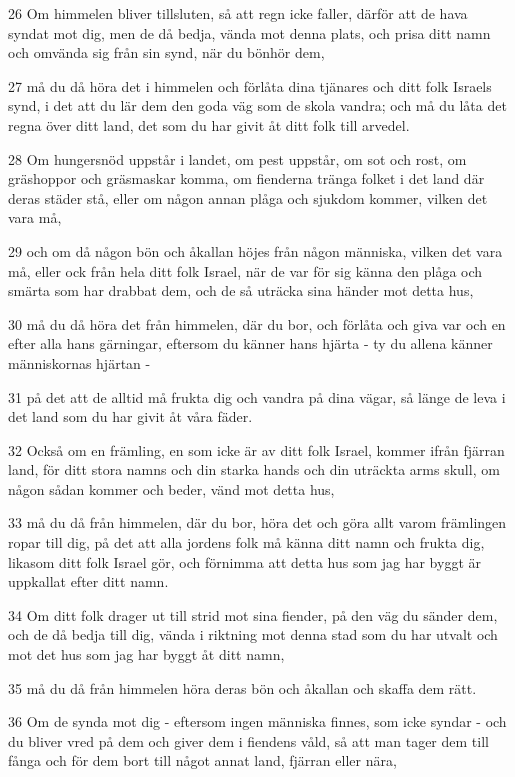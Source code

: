 \par 26 Om himmelen bliver tillsluten, så att regn icke faller, därför att de hava syndat mot dig, men de då bedja, vända mot denna plats, och prisa ditt namn och omvända sig från sin synd, när du bönhör dem,
\par 27 må du då höra det i himmelen och förlåta dina tjänares och ditt folk Israels synd, i det att du lär dem den goda väg som de skola vandra; och må du låta det regna över ditt land, det som du har givit åt ditt folk till arvedel.
\par 28 Om hungersnöd uppstår i landet, om pest uppstår, om sot och rost, om gräshoppor och gräsmaskar komma, om fienderna tränga folket i det land där deras städer stå, eller om någon annan plåga och sjukdom kommer, vilken det vara må,
\par 29 och om då någon bön och åkallan höjes från någon människa, vilken det vara må, eller ock från hela ditt folk Israel, när de var för sig känna den plåga och smärta som har drabbat dem, och de så uträcka sina händer mot detta hus,
\par 30 må du då höra det från himmelen, där du bor, och förlåta och giva var och en efter alla hans gärningar, eftersom du känner hans hjärta - ty du allena känner människornas hjärtan -
\par 31 på det att de alltid må frukta dig och vandra på dina vägar, så länge de leva i det land som du har givit åt våra fäder.
\par 32 Också om en främling, en som icke är av ditt folk Israel, kommer ifrån fjärran land, för ditt stora namns och din starka hands och din uträckta arms skull, om någon sådan kommer och beder, vänd mot detta hus,
\par 33 må du då från himmelen, där du bor, höra det och göra allt varom främlingen ropar till dig, på det att alla jordens folk må känna ditt namn och frukta dig, likasom ditt folk Israel gör, och förnimma att detta hus som jag har byggt är uppkallat efter ditt namn.
\par 34 Om ditt folk drager ut till strid mot sina fiender, på den väg du sänder dem, och de då bedja till dig, vända i riktning mot denna stad som du har utvalt och mot det hus som jag har byggt åt ditt namn,
\par 35 må du då från himmelen höra deras bön och åkallan och skaffa dem rätt.
\par 36 Om de synda mot dig - eftersom ingen människa finnes, som icke syndar - och du bliver vred på dem och giver dem i fiendens våld, så att man tager dem till fånga och för dem bort till något annat land, fjärran eller nära,
